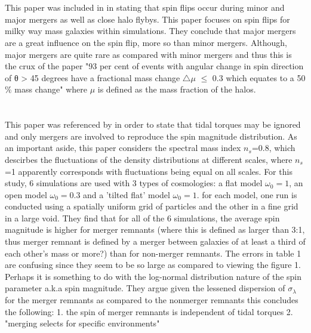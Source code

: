 \documentclass[fleqn,usenatbib]{mnras}
\begin{document}
\section{\citet{Bett_Frenk_12}}
This paper was included in \citet{Trowland_13} in stating that spin flips occur during minor and major mergers as well as close halo flybys.
This paper focuses on spin flips for milky way mass galaxies within simulations. They conclude that major mergers are a great influence on the spin flip, more so than minor mergers. Although, major mergers are quite rare as compared with minor mergers and thus this is the crux of the paper "93 per cent of events with angular change in spin direction of θ > 45 degrees have a fractional mass change $\triangle \mu$ $\leq$ 0.3 which equates to a 50 $\%$ mass change" where $\mu$ is defined as the mass fraction of the halos. 

\section{\citet{Gardner_01}}
This paper was referenced by \citet{Trowland_13} in order to state that tidal torques may be ignored and only mergers are involved to reproduce the spin magnitude distribution.
As an important aside, this paper considers the spectral mass index $n_{s}$=0.8, which descirbes the fluctuations of the density distributions at different scales, where $n_{s}$=1 apparently corresponds with fluctuations being equal on all scales. For this study, 6 simulations are used with 3 types of cosmologies: a flat model $\omega_{0}=1$, an open model $\omega_{0}=0.3$ and a 'tilted flat' model $\omega_{0}=1$. for each model, one run is conducted using a spatially uniform grid of particles and the other in a fine grid in a large void. 
They find that for all of the 6 simulations, the average spin magnitude is higher for merger remnants (where this is defined as larger than 3:1, thus merger remnant is defined by a merger between galaxies of at least a third of each other's mass or more?) than for non-merger remnants.
The errors in table 1 are confusing since they seem to be so large as compared to viewing the figure 1. Perhaps it is something to do with the log-normal distribution nature of the spin parameter a.k.a spin magnitude. 
They argue given the lessened dispersion of $\sigma_{\lambda}$ for the merger remnants as compared to the nonmerger remnants this concludes the following: 1. the spin of merger remnants is independent of tidal torques 2. "merging selects for specific environments"
\end{document}
